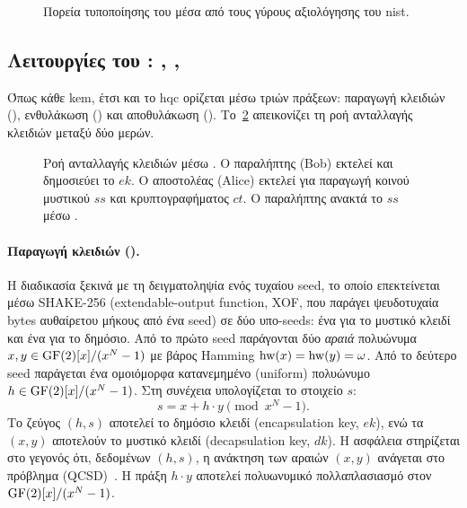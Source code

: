 \begin{figure}[htbp]
  \centering
  
  \caption[Πορεία τυποποίησης του HQC]{Πορεία τυποποίησης του \HQC μέσα από τους γύρους αξιολόγησης του
  \gls{nist}.}
  \label{fig:hqc-timeline}
\end{figure}


\subsection{Λειτουργίες του \KEM: \KeyGen, \Encaps, \Decaps}
\label{sec:hqc-kem-ops}

Όπως κάθε \gls{kem}, έτσι και το \gls{hqc} ορίζεται μέσω τριών πράξεων: παραγωγή κλειδιών (\KeyGen),
ενθυλάκωση (\Encaps) και αποθυλάκωση (\Decaps).
Το~\cref{fig:hqc-kem-sequence} απεικονίζει τη ροή ανταλλαγής κλειδιών μεταξύ
δύο μερών.

\begin{figure}[htbp]
  \centering
  
  \caption[Πρωτόκολλο HQC KEM]{Ροή ανταλλαγής κλειδιών μέσω \HQC \KEM. Ο παραλήπτης (Bob) εκτελεί
  \KeyGen και δημοσιεύει το $ek$. Ο αποστολέας (Alice) εκτελεί \Encaps για
  παραγωγή κοινού μυστικού $ss$ και κρυπτογραφήματος $ct$. Ο παραλήπτης
  ανακτά το $ss$ μέσω \Decaps.}
  \label{fig:hqc-kem-sequence}
\end{figure}

\paragraph{Παραγωγή κλειδιών (\KeyGen).}
Η διαδικασία ξεκινά με τη δειγματοληψία ενός τυχαίου seed, το οποίο επεκτείνεται
μέσω SHAKE-256 (extendable-output function, XOF, που παράγει ψευδοτυχαία bytes αυθαίρετου μήκους από ένα seed) σε δύο υπο-seeds: ένα για το μυστικό κλειδί και ένα για το
δημόσιο.
Από το πρώτο seed παράγονται δύο \emph{αραιά} πολυώνυμα $x, y \in \mathrm{GF}(2)[x]/(x^{N}-1)$ με
βάρος Hamming $\operatorname{hw}(x) = \operatorname{hw}(y) = \omega$.
Από το δεύτερο seed παράγεται ένα ομοιόμορφα κατανεμημένο (uniform) πολυώνυμο $h \in \mathrm{GF}(2)[x]/(x^{N}-1)$.
Στη συνέχεια υπολογίζεται το στοιχείο $s$:
\begin{equation}
  s = x + h \cdot y \pmod{x^N - 1}.
\end{equation}
Το ζεύγος $(h, s)$ αποτελεί το δημόσιο κλειδί (encapsulation key, $ek$), ενώ τα
$(x, y)$ αποτελούν το μυστικό κλειδί (decapsulation key, $dk$).
Η ασφάλεια στηρίζεται στο γεγονός ότι, δεδομένων $(h, s)$, η ανάκτηση των
αραιών $(x, y)$ ανάγεται στο πρόβλημα  (QCSD)~\cite{AguilarMelchor2018-QCSD}.
Η πράξη $h \cdot y$ αποτελεί πολυωνυμικό πολλαπλασιασμό στον $\mathrm{GF}(2)[x]/(x^{N}-1)$.


